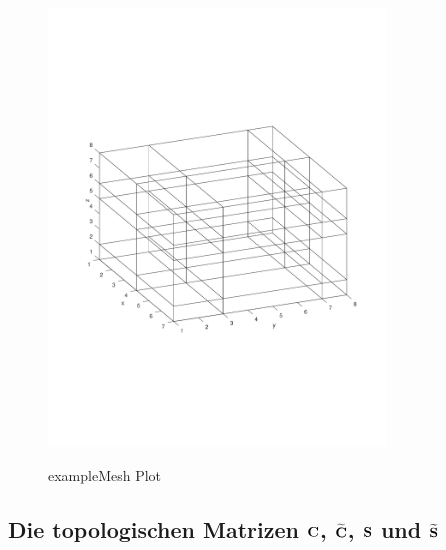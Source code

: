\documentclass[Protokollheft.tex]{subfiles}
\begin{document}
	\begin{figure}[h!]
	\centering
	\includegraphics[width=0.8\textwidth]{exmesh.pdf}
	\label{abb:example}
	\caption{exampleMesh Plot}
\end{figure}

%
    {\subsection{Die topologischen Matrizen $\mathbf{C}$, $\widetilde{\mathbf{C}}$, $\mathbf{S}$ und $\widetilde{\mathbf{S}}$}}
\end{document}
